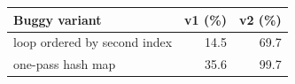 \begin{tabular}{lrr}
\toprule
Buggy variant & v1 (\%) & v2 (\%) \\
\midrule
loop ordered by second index & 14.5 & 69.7 \\
one-pass hash map & 35.6 & 99.7 \\
\bottomrule
\end{tabular}
